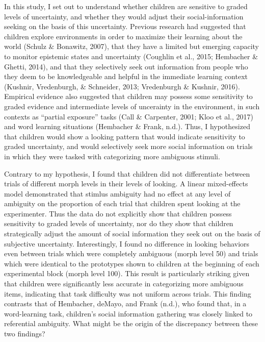 \documentclass[floatsintext,man]{apa6}
\theoremstyle{definition}
\theoremstyle{definition}
\theoremstyle{definition}
\theoremstyle{remark}
\begin{document}
In this study, I set out to understand whether children are sensitive to
graded levels of uncertainty, and whether they would adjust their
social-information seeking on the basis of this uncertainty. Previous
research had suggested that children explore environments in order to
maximize their learning about the world (Schulz \& Bonawitz, 2007), that
they have a limited but emerging capacity to monitor epistemic states
and uncertainty (Coughlin et al., 2015; Hembacher \& Ghetti, 2014), and
that they selectively seek out information from people who they deem to
be knowledgeable and helpful in the immediate learning context (Kushnir,
Vredenburgh, \& Schneider, 2013; Vredenburgh \& Kushnir, 2016).
Empirical evidence also suggested that children may possess some
sensitivity to graded evidence and intermediate levels of uncerainty in
the environment, in such contexts as \enquote{partial exposure} tasks
(Call \& Carpenter, 2001; Kloo et al., 2017) and word learning
situations (Hembacher \& Frank, n.d.). Thus, I hypothesized that
children would show a looking pattern that would indicate sensitivity to
graded uncertainty, and would selectively seek more social information
on trials in which they were tasked with categorizing more ambiguous
stimuli.

Contrary to my hypothesis, I found that children did not differentiate
between trials of different morph levels in their levels of looking. A
linear mixed-effects model demonstrated that stimlus ambiguity had no
effect at any level of ambiguity on the proportion of each trial that
children spent looking at the experimenter. Thus the data do not
explicitly show that children possess sensitivity to graded levels of
uncertainty, nor do they show that children strategically adjust the
amount of social information they seek out on the basis of subjective
uncertainty. Interestingly, I found no difference in looking behaviors
even between trials which were completely ambiguous (morph level 50) and
trials which were identical to the prototypes shown to children at the
beginning of each experimental block (morph level 100). This result is
particularly striking given that children were significantly less
accurate in categorizing more ambiguous items, indicating that task
difficulty was not uniform across trials. This finding contrasts that of
Hembacher, deMayo, and Frank (n.d.), who found that, in a word-learning
task, children's social information gathering was closely linked to
referential ambiguity. What might be the origin of the discrepancy
between these two findings?
\end{document}
